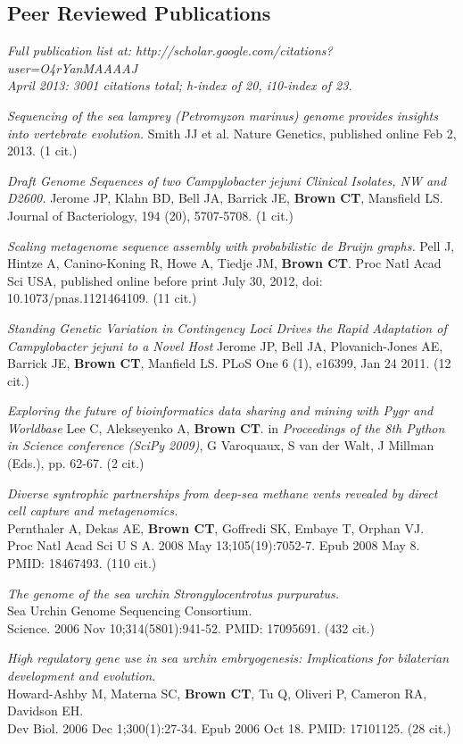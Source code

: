 \documentclass[margin,line]{resume}
\begin{document}
\begin{resume}
    \section{\mysidestyle Peer Reviewed Publications}
{\em Full publication list at: http://scholar.google.com/citations?user=O4rYanMAAAAJ\\
April 2013: 3001 citations total; h-index of 20, i10-index of 23.}

{\em Sequencing of the sea lamprey (Petromyzon marinus) genome provides insights into vertebrate evolution.} Smith JJ et al. Nature Genetics, published online Feb 2, 2013. (1 cit.)

{\em Draft Genome Sequences of two Campylobacter jejuni Clinical Isolates,
NW and D2600.} Jerome JP, Klahn BD, Bell JA, Barrick JE, {\bf Brown CT}, Mansfield LS. Journal of Bacteriology, 194 (20), 5707-5708. (1 cit.)

{\em Scaling metagenome sequence assembly with probabilistic de Bruijn
graphs.} Pell J, Hintze A, Canino-Koning R, Howe A, Tiedje JM, {\bf Brown
  CT}. Proc Natl Acad Sci USA, published online before print July 30,
  2012, doi: 10.1073/pnas.1121464109. (11 cit.)

{\em Standing Genetic Variation in Contingency Loci Drives the Rapid
  Adaptation of Campylobacter jejuni to a Novel Host} Jerome JP, Bell
JA, Plovanich-Jones AE, Barrick JE, {\bf Brown CT}, Manfield LS.  PLoS One 6
(1), e16399, Jan 24 2011. (12 cit.)

{\em Exploring the future of bioinformatics data sharing and mining
  with Pygr and Worldbase} Lee C, Alekseyenko A, {\bf Brown CT}.  in {\em
  Proceedings of the 8th Python in Science conference (SciPy 2009)}, G
Varoquaux, S van der Walt, J Millman (Eds.), pp. 62-67.  (2 cit.)

{\em Diverse syntrophic partnerships from deep-sea methane vents revealed by direct cell capture and metagenomics.}\\
Pernthaler A, Dekas AE, {\bf Brown CT}, Goffredi SK, Embaye T, Orphan VJ.\\
Proc Natl Acad Sci U S A. 2008 May
13;105(19):7052-7. Epub 2008 May 8.  PMID: 18467493.  (110 cit.)

{\em The genome of the sea urchin Strongylocentrotus purpuratus.}\\
Sea Urchin Genome Sequencing Consortium.\\
Science. 2006 Nov 10;314(5801):941-52.
PMID: 17095691.  (432 cit.)

{\em High regulatory gene use in sea urchin embryogenesis: Implications for bilaterian development and evolution.}\\
Howard-Ashby M, Materna SC, {\bf Brown CT}, Tu Q, Oliveri P, Cameron RA, Davidson EH.\\
Dev Biol. 2006 Dec 1;300(1):27-34. Epub 2006 Oct 18.
PMID: 17101125.  (28 cit.)


\end{resume}
\end{document}
